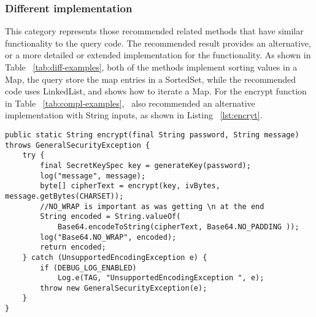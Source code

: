 \subsubsection{Different implementation} This category represents those recommended related methods that have similar functionality to the query code. The recommended result provides an alternative, or a more detailed or extended implementation for the functionality. As shown in Table ~\ref{tab:diff-examples}, both of the methods implement sorting values in a {\ttt Map}, the query store the map entries in a {\ttt SortedSet}, while the recommended code uses {\ttt LinkedList}, and shows how to iterate a {\ttt Map}. For the {\ttt encrypt} function in Table ~\ref{tab:compl-examples}, \tool\ also recommended an alternative implementation with {\ttt String} inputs, as shown in Listing ~\ref{lst:encryt}.


\begin{lstlisting}[caption={different implementation for \texttt{encrypt}}, label={lst:encryt}]
public static String encrypt(final String password, String message) throws GeneralSecurityException {
	try {
		final SecretKeySpec key = generateKey(password);
		log("message", message);
		byte[] cipherText = encrypt(key, ivBytes, message.getBytes(CHARSET));
		//NO_WRAP is important as was getting \n at the end
		String encoded = String.valueOf(
			Base64.encodeToString(cipherText, Base64.NO_PADDING ));
		log("Base64.NO_WRAP", encoded);
		return encoded;
	} catch (UnsupportedEncodingException e) {
		if (DEBUG_LOG_ENABLED)
			Log.e(TAG, "UnsupportedEncodingException ", e);
		throw new GeneralSecurityException(e);
	}
}
\end{lstlisting}



